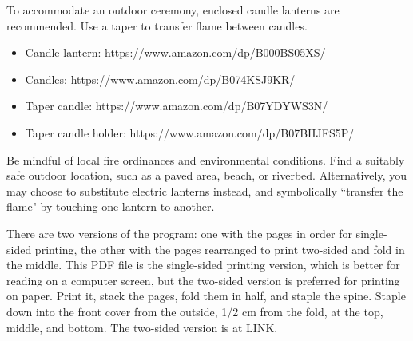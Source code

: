 \documentclass{article}
\begin{document}
To accommodate an outdoor ceremony, enclosed candle lanterns are recommended.
Use a taper to transfer flame between candles.

\begin{itemize} \itemsep0pt \parskip0pt 
	\item Candle lantern: https://www.amazon.com/dp/B000BS05XS/
	\item Candles: https://www.amazon.com/dp/B074KSJ9KR/
	\item Taper candle: https://www.amazon.com/dp/B07YDYWS3N/
	\item Taper candle holder: https://www.amazon.com/dp/B07BHJFS5P/
\end{itemize}

Be mindful of local fire ordinances and environmental conditions. Find a suitably safe outdoor location, such as a paved area, beach, or riverbed. Alternatively, you may choose to substitute electric lanterns instead, and symbolically ``transfer the flame" by touching one lantern to another.

There are two versions of the program: one with the pages in order for
single-sided printing, the other with the pages rearranged to print two-sided
and fold in the middle. This PDF file is the single-sided printing version,
which is better for reading on a computer screen, but the two-sided version is
preferred for printing on paper. Print it, stack the pages, fold them in half,
and staple the spine. Staple down into the front cover from the outside, 1/2
cm from the fold, at the top, middle, and bottom. The two-sided version is at
LINK{}. %
\end{document}
